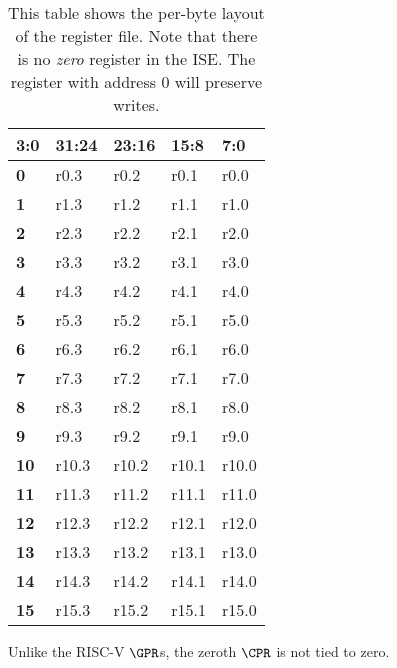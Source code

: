 \begin{table}[h!]
\centering
\begin{tabular}{|l|l l l l|}
\hline
\multicolumn{1}{|l|}{3:0} & \textbf{31:24} & \textbf{23:16} & \textbf{15:8} & \textbf{7:0} \\ \hline
\textbf{0 }   & r0.3       & r0.2       & r0.1       & r0.0       \\ \hline
\textbf{1 }   & r1.3       & r1.2       & r1.1       & r1.0       \\ \hline
\textbf{2 }   & r2.3       & r2.2       & r2.1       & r2.0       \\ \hline
\textbf{3 }   & r3.3       & r3.2       & r3.1       & r3.0       \\ \hline
\textbf{4 }   & r4.3       & r4.2       & r4.1       & r4.0       \\ \hline
\textbf{5 }   & r5.3       & r5.2       & r5.1       & r5.0       \\ \hline
\textbf{6 }   & r6.3       & r6.2       & r6.1       & r6.0       \\ \hline
\textbf{7 }   & r7.3       & r7.2       & r7.1       & r7.0       \\ \hline
\textbf{8 }   & r8.3       & r8.2       & r8.1       & r8.0       \\ \hline
\textbf{9 }   & r9.3       & r9.2       & r9.1       & r9.0       \\ \hline
\textbf{10}   & r10.3      & r10.2      & r10.1      & r10.0      \\ \hline
\textbf{11}   & r11.3      & r11.2      & r11.1      & r11.0      \\ \hline
\textbf{12}   & r12.3      & r12.2      & r12.1      & r12.0      \\ \hline
\textbf{13}   & r13.3      & r13.2      & r13.1      & r13.0      \\ \hline
\textbf{14}   & r14.3      & r14.2      & r14.1      & r14.0      \\ \hline
\textbf{15}   & r15.3      & r15.2      & r15.1      & r15.0      \\ \hline
\end{tabular}
\caption{This table shows the per-byte layout of the register file. Note
that there is no {\em zero} register in the ISE. The register with
address $0$ will preserve writes.}
\label{tab:state-addr}
\end{table}

Unlike the RISC-V $\GPR$s, the zeroth $\CPR$ is not tied to zero.


